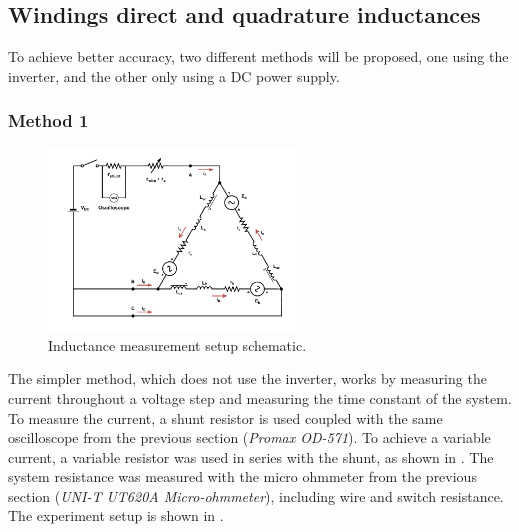 \subsection{Windings direct and quadrature inductances}
\label{sec:inductance}

To achieve better accuracy, two different methods will be proposed, one using the inverter, and the other only using a DC power supply.
\subsubsection{Method 1}
\label{sec:inductance_method1}

\begin{figure}[!htb]
	\centering
	\includegraphics[width=0.6\textwidth]{Figures/Ld_measure.pdf}
	\caption[Inductance measurement setup schematic.]{Inductance measurement setup schematic.}
	\label{fig:Ld_measure_schematic} %
\end{figure}

The simpler method, which does not use the inverter, works by measuring the current throughout a voltage step and measuring the time constant of the system. To measure the current, a shunt resistor is used coupled with the same oscilloscope from the previous section (\textit{Promax OD-571}). To achieve a variable current, a variable resistor was used in series with the shunt, as shown in . The system resistance was measured with the micro ohmmeter from the previous section (\textit{UNI-T UT620A Micro-ohmmeter}), including wire and switch resistance. The experiment setup is shown in .



